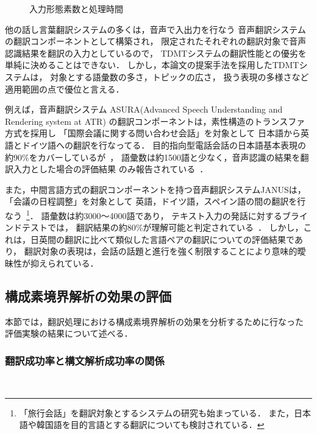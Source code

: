 \begin{figure}[htb]
\begin{center}
\vspace{-2mm}
\caption{入力形態素数と処理時間}
\label{time}
\end{center}

\end{figure}

他の話し言葉翻訳システムの多くは，音声で入出力を行なう
音声翻訳システムの翻訳コンポーネントとして構築され，
限定されたそれぞれの翻訳対象で音声認識結果を翻訳の入力としているので，
TDMTシステムの翻訳性能との優劣を単純に決めることはできない．
しかし，本論文の提案手法を採用したTDMTシステムは，
対象とする語彙数の多さ，トピックの広さ，
扱う表現の多様さなど適用範囲の点で優位と言える．

例えば，音声翻訳システム
ASURA(Advanced Speech Understanding and Rendering system at ATR)
の翻訳コンポーネントは，素性構造のトランスファ方式を採用し
「国際会議に関する問い合わせ会話」を対象として
日本語から英語とドイツ語への翻訳を行なってる．
目的指向型電話会話の日本語基本表現の約90\%をカバーしているが~\cite{Uratani}，
語彙数は約1500語と少なく，音声認識の結果を翻訳入力とした場合の評価結果
のみ報告されている~\cite{Morimoto}．

また，中間言語方式の翻訳コンポーネントを持つ音声翻訳システムJANUSは，
「会議の日程調整」を対象として
英語，ドイツ語，スペイン語の間の翻訳を行なう~\footnote{
「旅行会話」を翻訳対象とするシステムの研究も始まっている．
また，日本語や韓国語を目的言語とする翻訳についても検討されている．}．
語彙数は約3000〜4000語であり，
テキスト入力の発話に対するブラインドテストでは，
翻訳結果の約80\%が理解可能と判定されている~\cite{Lavie}．
しかし，これは，日英間の翻訳に比べて類似した言語ペアの翻訳についての評価結果であり，
翻訳対象の表現は，会話の話題と進行を強く制限することにより意味的曖昧性が抑えられている．

\subsection{構成素境界解析の効果の評価}

本節では，翻訳処理における構成素境界解析の効果を分析するために行なった
評価実験の結果について述べる．

\subsubsection{翻訳成功率と構文解析成功率の関係}~\label{eval-cbp}

